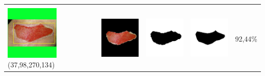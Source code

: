 \begin{table}[H]
\begin{tabular}{|m{1.0in}|m{1.0in}|m{1.0in}|m{1.0in}|m{0.6in}|}
		&  &  & \\
		\includegraphics[width=1.0in]{gambar/hasil_segmentasi/luka_merah/image_24_rect.jpg} {\centering\fontsize{10}{10}\selectfont(37,98,270,134)}&
		\includegraphics[width=1.0in]{gambar/hasil_segmentasi/luka_merah/result_24.jpg}&
		\includegraphics[width=1.0in]{gambar/hasil_segmentasi/luka_merah/mask_r_24.jpg}&
		\includegraphics[width=1.0in]{gambar/hasil_segmentasi/luka_merah/24_r.jpg}&
		92,44\% \\
		\hline


\end{tabular}
\end{table}
